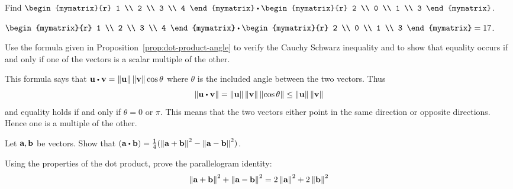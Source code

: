 
\begin{ex}
  Find $\begin{mymatrix}{r}
    1 \\
    2 \\
    3 \\
    4
  \end{mymatrix} \dotprod \begin{mymatrix}{r}
    2 \\
    0 \\
    1 \\
    3
  \end{mymatrix}$.
  \begin{sol}
    $\begin{mymatrix}{r}
      1 \\
      2 \\
      3 \\
      4
    \end{mymatrix} \dotprod \begin{mymatrix}{r}
      2 \\
      0 \\
      1 \\
      3
    \end{mymatrix} = 17$.
  \end{sol}
\end{ex}

\begin{ex}
  Use the formula given in Proposition~\ref{prop:dot-product-angle} to
  verify the Cauchy Schwarz inequality and to show that equality
  occurs if and only if one of the vectors is a scalar multiple of the
  other.
  \begin{sol}
    This formula says that
    $\vect{u}\dotprod \vect{v}=\norm{ \vect{u}} \norm{\vect{v}} \cos
    \theta$ where $ \theta $ is the included angle between the two
    vectors. Thus
    \begin{equation*}
      \norm{\vect{u}\dotprod \vect{v}} =\norm{\vect{u}}
      \norm{\vect{v}} \norm{\cos \theta} \leq
      \norm{\vect{u}} \norm{\vect{v}}
    \end{equation*}
    and equality holds if and only if $\theta =0$ or $\pi$. This means
    that the two vectors either point in the same direction or
    opposite directions. Hence one is a multiple of the other.
  \end{sol}
\end{ex}

\begin{ex}
  Let $\vect{a},\vect{b}$ be vectors. Show that
  $(\vect{a}\dotprod \vect{b}) =\frac{1}{4}(\norm{ \vect{a}+\vect{b}}
  ^{2}-\norm{\vect{a}-\vect{b}} ^{2})$.
\end{ex}

\begin{ex}
  Using the properties of the dot product, prove the parallelogram
  identity:
  \begin{equation*}
    \norm{\vect{a}+\vect{b}} ^{2}+\norm{\vect{a}-\vect{b}}
    ^{2}=2\norm{\vect{a}} ^{2}+2\norm{\vect{b}
    } ^{2}
  \end{equation*}
\end{ex}

